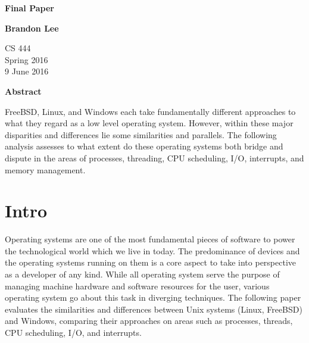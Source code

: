 \documentclass[letterpaper,10pt,titlepage]{article}
\begin{document}
\begin{titlepage}
    \begin{center}
        \vspace*{3.5cm}

        \textbf{Final Paper}

        \vspace{0.5cm}

        \textbf{Brandon Lee}

        \vspace{0.8cm}

        CS 444\\
        Spring 2016\\
        9 June 2016\\

        \vspace{1cm}

        \textbf{Abstract}\\

        \vspace{0.5cm}

        FreeBSD, Linux, and Windows each take fundamentally different approaches to what they regard as a low level operating system.  However, within these major disparities and differences lie some similarities and parallels.  The following analysis assesses to what extent do these operating systems both bridge and dispute in the areas of processes, threading, CPU scheduling, I/O, interrupts, and memory management.

        \vfill

    \end{center}
\end{titlepage}

\newpage

\tableofcontents

\newpage

\section{Intro}

Operating systems are one of the most fundamental pieces of software to power the technological world which we live in today.  The predominance of devices and the operating systems running on them is a core aspect to take into perspective as a developer of any kind.  While all operating system serve the purpose of managing machine hardware and software resources for the user, various operating system go about this task in diverging techniques.  The following paper evaluates the similarities and differences between Unix systems (Linux, FreeBSD) and Windows, comparing their approaches on areas such as processes, threads, CPU scheduling, I/O, and interrupts.
\end{document}
